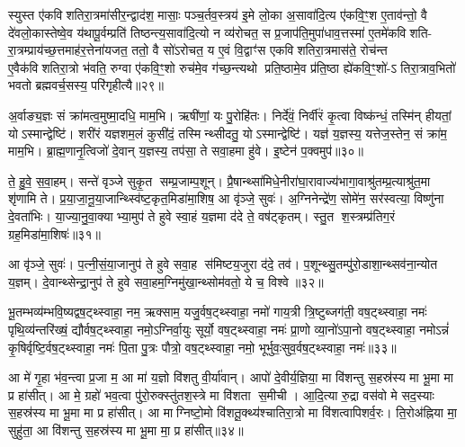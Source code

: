 स्युस्त ए॑कविशतिरा॒त्रमा॑सीर॒न्द्वाद॑श॒ मासाः॒ पञ्च॒र्तव॒स्त्रय॑ इ॒मे लो॒का अ॒सावा॑दि॒त्य ए॑कवि॒ꣳ॒श ए॒ताव॑न्तो॒ वै दे॑वलो॒कास्तेष्वे॒व य॑थापू॒र्वम्प्रति॑ तिष्ठन्त्य॒सावा॑दि॒त्यो न व्य॑रोचत॒ स प्र॒जाप॑ति॒मुपा॑धाव॒त्तस्मा॑ ए॒तमे॑कविशति- रा॒त्रम्प्राय॑च्छ॒त्तमाह॑र॒त्तेना॑यजत॒ ततो॒ वै सो॑ऽरोचत॒ य ए॒वं वि॒द्वाꣳ॑स एकविशतिरा॒त्रमास॑ते॒ रोच॑न्त ए॒वैक॑विशतिरा॒त्रो भ॑वति॒ रुग्वा ए॑कवि॒ꣳ॒शो रुच॑मे॒व ग॑च्छ॒न्त्यथो प्रति॒ष्ठामे॒व प्र॑ति॒ष्ठा ह्ये॑कवि॒ꣳ॒शो॑-ऽ तिरा॒त्राव॒भितो॑ भवतो ब्रह्मवर्च॒सस्य॒ परि॑गृहीत्यै॥२९॥

{\anuvakamend[{गृ॒ह्ण॒न्ति॒ दि॒वा॒की॒र्त्ये॑नै॒वोभ॒यतो॒ नाप्र॑तिष्ठिता॒ आस॑त॒ एक॑विशतिश्च॥10॥}]}

अ॒र्वाङ्य॒ज्ञः सं क्रा॑मत्व॒मुष्मा॒दधि॒ माम॒भि। ऋषी॑णां॒ यः पु॒रोहि॑तः। निर्दे॑वं॒ निर्वी॑रं कृ॒त्वा विष्क॑न्धं॒ तस्मि॑न् हीयतां॒ योऽस्मान्द्वेष्टि॑। शरी॑रं यज्ञशम॒लं कुसी॑दं॒ तस्मिन्थ्सीदतु॒ योऽस्मान्द्वेष्टि॑। यज्ञ॑ य॒ज्ञस्य॒ यत्तेज॒स्तेन॒ सं क्रा॑म॒ माम॒भि। ब्रा॒ह्म॒णानृ॒त्विजो॑ दे॒वान् य॒ज्ञस्य॒ तप॑सा॒ ते सवा॒हमा हु॑वे। इ॒ष्टेन॑ प॒क्वमुप॑॥३०॥

ते॒ हु॒वे॒ स॒वा॒हम्। सन्ते॑ वृञ्जे सुकृ॒त सम्प्र॒जाम्प॒शून्। प्रै॒षान्थ्सा॑मिधे॒नीरा॑घा॒रावाज्य॑भागा॒वाश्रु॑तम्प्र॒त्याश्रु॑त॒मा शृ॑णामि ते। प्र॒या॒जा॒नू॒या॒जान्थ्स्वि॑ष्ट॒कृत॒मिडा॑मा॒शिष॒ आ वृ॑ञ्जे॒ सुवः॑। अ॒ग्निनेन्द्रे॑ण॒ सोमे॑न॒ सर॑स्वत्या॒ विष्णु॑ना दे॒वता॑भिः। या॒ज्या॒नु॒वा॒क्याभ्या॒मुप॑ ते हुवे स्वा॒हं य॒ज्ञमा द॑दे ते॒ वष॑ट्कृतम्। स्तु॒त श॒स्त्रम्प्र॑तिग॒रं ग्रह॒मिडा॑मा॒शिषः॑॥३१॥

आ वृ॑ञ्जे॒ सुवः॑। प॒त्नी॒सं॒या॒जानुप॑ ते हुवे सवा॒ह स॑मिष्टय॒जुरा द॑दे॒ तव॑। प॒शून्थ्सु॒तम्पु॑रो॒डाशा॒न्थ्सव॑ना॒न्योत य॒ज्ञम्। दे॒वान्थ्सेन्द्रा॒नुप॑ ते हुवे सवा॒हम॒ग्निमु॑खा॒न्थ्सोम॑वतो॒ ये च॒ विश्वे॥३२॥

{\anuvakamend[{उप॒ ग्रह॒मिडा॑मा॒शिषो॒ द्वात्रिꣳ॑शच्च॥11॥}]}

भू॒तम्भव्य॑म्भवि॒ष्यद्वष॒ट्थ्स्वाहा॒ नम॒ ऋक्साम॒ यजु॒र्वष॒ट्थ्स्वाहा॒ नमो॑ गाय॒त्री त्रि॒ष्टुब्जग॑ती॒ वष॒ट्थ्स्वाहा॒ नमः॑ पृथि॒व्य॑न्तरि॑ख्षं॒ द्यौर्वष॒ट्थ्स्वाहा॒ नमो॒ऽग्निर्वा॒युः सूर्यो॒ वष॒ट्थ्स्वाहा॒ नमः॑ प्रा॒णो व्या॒नो॑ऽपा॒नो वष॒ट्थ्स्वाहा॒ नमोऽन्नं॑ कृ॒षिर्वृष्टि॒र्वष॒ट्थ्स्वाहा॒ नमः॑ पि॒ता पु॒त्रः पौत्रो॒ वष॒ट्थ्स्वाहा॒ नमो॒ भूर्भुवः॒सुव॒र्वष॒ट्थ्स्वाहा॒ नमः॑॥३३॥

{\anuvakamend[{भुव॑श्च॒त्वारि॑ च॥12॥}]}

आ मे॑ गृ॒हा भ॑व॒न्त्वा प्र॒जा म॒ आ मा॑ य॒ज्ञो वि॑शतु वी॒र्या॑वान्। आपो॑ दे॒वीर्य॒ज्ञिया॒ मा वि॑शन्तु स॒हस्र॑स्य मा भू॒मा मा प्र हा॑सीत्। आ मे॒ ग्रहो॑ भव॒त्वा पु॑रो॒रुक्स्तु॑तश॒स्त्रे मा वि॑शता स॒मीची। आ॒दि॒त्या रु॒द्रा वस॑वो मे सद॒स्याः स॒हस्र॑स्य मा भू॒मा मा प्र हा॑सीत्। आ माग्निष्टो॒मो वि॑शतू॒क्थ्य॑श्चातिरा॒त्रो मा वि॑शत्वापिशर्व॒रः। ति॒रोअ॑ह्निया मा॒ सुहु॑ता॒ आ वि॑शन्तु स॒हस्र॑स्य मा भू॒मा मा॒ प्र हा॑सीत्॥३४॥

